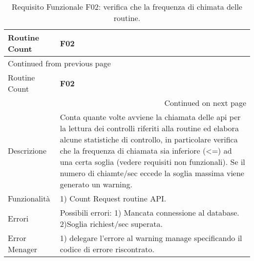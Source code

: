 \documentclass[onecolumn,a4paper]{article}
\begin{document}
\begin{longtable}{|p{3cm}|p{10cm}|}
\caption{Requisito Funzionale F02: verifica che la frequenza di chimata delle routine.}
\\
\cellcolor{grey!15}Routine Count & \cellcolor{grey!15} \textbf{F02}\\
\hline
\endfirsthead
\multicolumn{2}{l}{Continued from previous page} \\
\hline

\cellcolor{grey!15}Routine Count & \cellcolor{grey!15} \textbf{F02} \\

\hline
\endhead
\hline\multicolumn{2}{r}{Continued on next page} \\
\endfoot
\endlastfoot
\hline
Descrizione & Conta quante volte avviene la chiamata delle api per la lettura dei controlli riferiti alla routine ed elabora alcune statistiche di controllo, in particolare verifica che la frequenza di chiamata sia inferiore (<=) ad una certa soglia (vedere requisiti non funzionali). Se il numero di chiamte/sec eccede la soglia massima viene generato un warning.\\
\hline
Funzionalità & 1) Count Request routine API.\\
\hline
Errori & Possibili errori: 1) Mancata connessione al database. 2)Soglia richiest/sec superata.\\
\hline
Error Menager & 1) delegare l'errore al warning manage specificando il codice di errore riscontrato.\\
\hline
\end{longtable}
\end{document}
